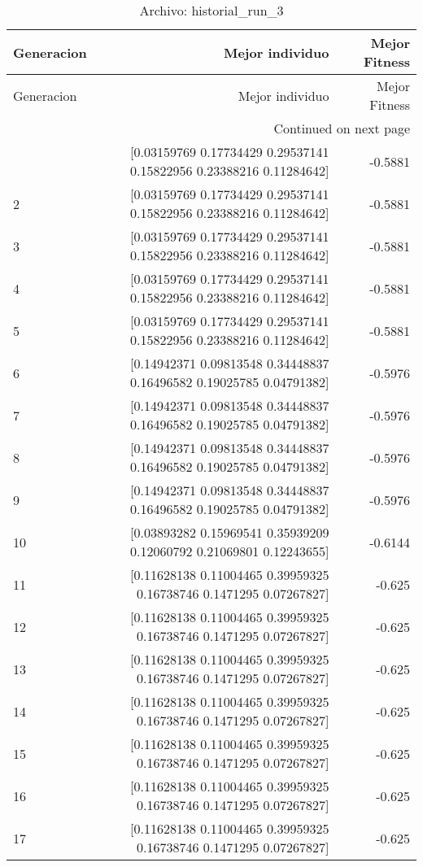 \begin{longtable}{lrr}
\caption{Archivo: historial\_run\_3}\label{tab:historial_run_3} \\
\toprule
Generacion & Mejor individuo & Mejor Fitness \\
\midrule
\endfirsthead
\toprule
Generacion & Mejor individuo & Mejor Fitness \\
\midrule
\endhead
\midrule
\multicolumn{3}{r}{Continued on next page} \\
\midrule
\endfoot
\bottomrule
\endlastfoot
1 & [0.03159769 0.17734429 0.29537141 0.15822956 0.23388216 0.11284642] & -0.5881 \\
2 & [0.03159769 0.17734429 0.29537141 0.15822956 0.23388216 0.11284642] & -0.5881 \\
3 & [0.03159769 0.17734429 0.29537141 0.15822956 0.23388216 0.11284642] & -0.5881 \\
4 & [0.03159769 0.17734429 0.29537141 0.15822956 0.23388216 0.11284642] & -0.5881 \\
5 & [0.03159769 0.17734429 0.29537141 0.15822956 0.23388216 0.11284642] & -0.5881 \\
6 & [0.14942371 0.09813548 0.34448837 0.16496582 0.19025785 0.04791382] & -0.5976 \\
7 & [0.14942371 0.09813548 0.34448837 0.16496582 0.19025785 0.04791382] & -0.5976 \\
8 & [0.14942371 0.09813548 0.34448837 0.16496582 0.19025785 0.04791382] & -0.5976 \\
9 & [0.14942371 0.09813548 0.34448837 0.16496582 0.19025785 0.04791382] & -0.5976 \\
10 & [0.03893282 0.15969541 0.35939209 0.12060792 0.21069801 0.12243655] & -0.6144 \\
11 & [0.11628138 0.11004465 0.39959325 0.16738746 0.1471295  0.07267827] & -0.625 \\
12 & [0.11628138 0.11004465 0.39959325 0.16738746 0.1471295  0.07267827] & -0.625 \\
13 & [0.11628138 0.11004465 0.39959325 0.16738746 0.1471295  0.07267827] & -0.625 \\
14 & [0.11628138 0.11004465 0.39959325 0.16738746 0.1471295  0.07267827] & -0.625 \\
15 & [0.11628138 0.11004465 0.39959325 0.16738746 0.1471295  0.07267827] & -0.625 \\
16 & [0.11628138 0.11004465 0.39959325 0.16738746 0.1471295  0.07267827] & -0.625 \\
17 & [0.11628138 0.11004465 0.39959325 0.16738746 0.1471295  0.07267827] & -0.625 \\

\end{longtable}
